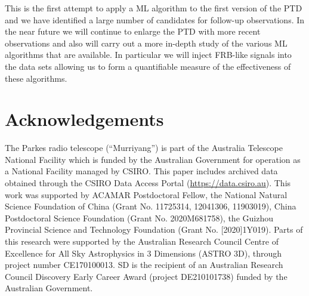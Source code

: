 \documentclass[fleqn,usenatbib]{mnras}
\newcommand\jw[1]{\textcolor{blue}{#1}}
\begin{document}


This is the first attempt to apply a ML algorithm to the first version of the PTD and we have identified a large number of candidates for follow-up observations.  In the near future we will continue to enlarge the PTD with more recent observations and also will carry out a more in-depth study of the various ML algorithms that are available.  In particular we will inject FRB-like signals into the data sets allowing us to form a quantifiable measure of the effectiveness of these algorithms.






\section*{Acknowledgements}
The Parkes radio telescope (``Murriyang'') is part of the Australia Telescope National Facility which is funded by the Australian Government for operation as a National Facility managed by CSIRO. This paper includes archived data obtained through the CSIRO Data Access Portal (\url{https://data.csiro.au}). This work was supported by ACAMAR Postdoctoral Fellow, the National Natural Science Foundation of China (Grant No. 11725314, 12041306, 11903019), China Postdoctoral Science Foundation (Grant No. 2020M681758), the Guizhou Provincial Science and Technology Foundation (Grant No. [2020]1Y019). Parts of this research were supported by the Australian Research Council Centre of Excellence for All Sky Astrophysics in 3 Dimensions (ASTRO 3D), through project number CE170100013. SD is the recipient of an Australian Research Council Discovery Early Career Award (project DE210101738) funded by the Australian Government.
\end{document}

